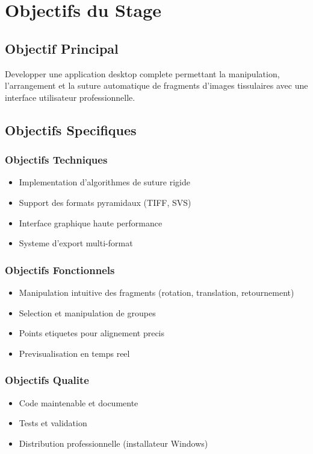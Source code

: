 \documentclass[12pt,a4paper]{article}
\begin{document}
\section{Objectifs du Stage}

\subsection{Objectif Principal}

Developper une application desktop complete permettant la manipulation, l'arrangement et la suture automatique de fragments d'images tissulaires avec une interface utilisateur professionnelle.

\subsection{Objectifs Specifiques}

\subsubsection{Objectifs Techniques}
\begin{itemize}
\item Implementation d'algorithmes de suture rigide
\item Support des formats pyramidaux (TIFF, SVS)
\item Interface graphique haute performance
\item Systeme d'export multi-format
\end{itemize}

\subsubsection{Objectifs Fonctionnels}
\begin{itemize}
\item Manipulation intuitive des fragments (rotation, translation, retournement)
\item Selection et manipulation de groupes
\item Points etiquetes pour alignement precis
\item Previsualisation en temps reel
\end{itemize}

\subsubsection{Objectifs Qualite}
\begin{itemize}
\item Code maintenable et documente
\item Tests et validation
\item Distribution professionnelle (installateur Windows)
\end{itemize}
\end{document}
